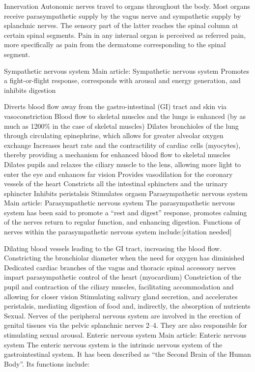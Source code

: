 Innervation
Autonomic nerves travel to organs throughout the body. Most organs receive parasympathetic supply by the vagus nerve and sympathetic supply by splanchnic nerves. The sensory part of the latter reaches the spinal column at certain spinal segments. Pain in any internal organ is perceived as referred pain, more specifically as pain from the dermatome corresponding to the spinal segment.

Sympathetic nervous system
Main article: Sympathetic nervous system
Promotes a fight-or-flight response, corresponds with arousal and energy generation, and inhibits digestion

Diverts blood flow away from the gastro-intestinal (GI) tract and skin via vasoconstriction
Blood flow to skeletal muscles and the lungs is enhanced (by as much as 1200\% in the case of skeletal muscles)
Dilates bronchioles of the lung through circulating epinephrine, which allows for greater alveolar oxygen exchange
Increases heart rate and the contractility of cardiac cells (myocytes), thereby providing a mechanism for enhanced blood flow to skeletal muscles
Dilates pupils and relaxes the ciliary muscle to the lens, allowing more light to enter the eye and enhances far vision
Provides vasodilation for the coronary vessels of the heart
Constricts all the intestinal sphincters and the urinary sphincter
Inhibits peristalsis
Stimulates orgasm
Parasympathetic nervous system
Main article: Parasympathetic nervous system
The parasympathetic nervous system has been said to promote a ``rest and digest'' response, promotes calming of the nerves return to regular function, and enhancing digestion. Functions of nerves within the parasympathetic nervous system include:{[}citation needed{]}

Dilating blood vessels leading to the GI tract, increasing the blood flow.
Constricting the bronchiolar diameter when the need for oxygen has diminished
Dedicated cardiac branches of the vagus and thoracic spinal accessory nerves impart parasympathetic control of the heart (myocardium)
Constriction of the pupil and contraction of the ciliary muscles, facilitating accommodation and allowing for closer vision
Stimulating salivary gland secretion, and accelerates peristalsis, mediating digestion of food and, indirectly, the absorption of nutrients
Sexual. Nerves of the peripheral nervous system are involved in the erection of genital tissues via the pelvic splanchnic nerves 2--4. They are also responsible for stimulating sexual arousal.
Enteric nervous system
Main article: Enteric nervous system
The enteric nervous system is the intrinsic nervous system of the gastrointestinal system. It has been described as ``the Second Brain of the Human Body''. Its functions include:

